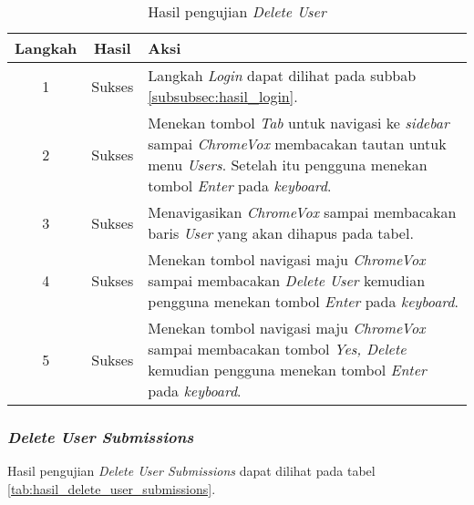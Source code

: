 \begin{table}[H]
	\centering
	\caption{Hasil pengujian \textit{Delete User}}
	\label{tab:hasil_delete_user}
	\begin{tabular}{|c|c|p{12cm}|}
		\toprule
		Langkah & Hasil & Aksi\\
		\midrule
		1 & Sukses & Langkah \textit{Login} dapat dilihat pada subbab \ref{subsubsec:hasil_login}.\\
		2 & Sukses & Menekan tombol \textit{Tab} untuk navigasi ke \textit{sidebar} sampai \textit{ChromeVox} membacakan tautan untuk menu \textit{Users}. Setelah itu pengguna menekan tombol \textit{Enter} pada \textit{keyboard}.\\
		3 & Sukses & Menavigasikan \textit{ChromeVox} sampai membacakan baris \textit{User} yang akan dihapus pada tabel.\\
		4 & Sukses & Menekan tombol navigasi maju \textit{ChromeVox} sampai membacakan \textit{Delete User} kemudian pengguna menekan tombol \textit{Enter} pada \textit{keyboard}.\\
		5 & Sukses & Menekan tombol navigasi maju \textit{ChromeVox} sampai membacakan tombol \textit{Yes, Delete} kemudian pengguna menekan tombol \textit{Enter} pada \textit{keyboard}.\\
		\bottomrule
	\end{tabular}
\end{table}

\subsubsection{\textit{Delete User Submissions}}
\label{subsubsec:hasil_delete_user_submissions}
Hasil pengujian \textit{Delete User Submissions} dapat dilihat pada tabel \ref{tab:hasil_delete_user_submissions}.

